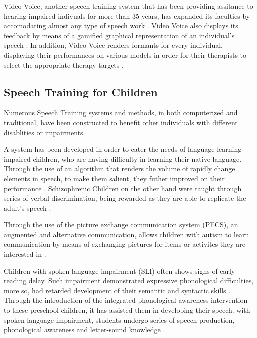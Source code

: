 Video Voice, another speech training system that has been providing assitance to hearing-impaired indivuals for more than 35 years, has expanded its faculties by accomodating almost any type of speech work \cite{videovoice:2015:description}. Video Voice also displays its feedback by means of a gamified graphical representation of an individual's speech \cite{videovoice:2015:speechtherapyapplications}. In addition, Video Voice renders formants for every individual, displaying their performances on various models in order for their therapists to select the appropriate therapy targets \cite{videovoice:2015:formantdisplays}.

\subsection{Speech Training for Children}

Numerous Speech Training systems and methods, in both computerized and traditional, have been constructed to benefit other individuals with different disablities or impairments. 

A system has been developed in order to cater the needs of language-learning impaired children, who are having difficulty in learning their native language. Through the use of an algorithm that renders the volume of rapidly change elements in speech, to make them salient, they futher improved on their performance \cite{jstor:1996:lli}. Schizophrenic Children on the other hand were taught through series of verbal discrimination, being rewarded as they are able to replicate the adult's speech \cite{science:1966:schizo}.

Through the use of the picture exchange communication system (PECS), an augmented and alternative communication, allows children with autism to learn communication by means of exchanging pictures for items or activites they are interested in \cite{wiley:2002:pictureexchange}. 

Children with spoken language impairment (SLI) often shows signs of early reading delay. Such impairment demonstrated expressive phonological difficulties, more so, had retarded development of their semantic and syntactic skills \cite{lshss:2000:sli}. Through the introduction of the integrated phonological awareness intervention to these preschool children, it has assisted them in developing their speech. with spoken language impairment, students undergo series of speech production, phonological awareness and letter-sound knowledge \cite{gillonmcneill:2007:sli}.

